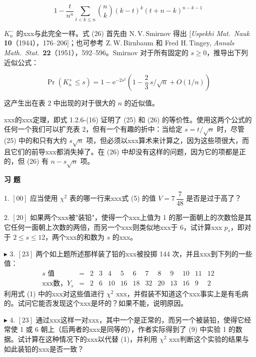 \begin{equation}
1 - \frac{t}{n^n} \sum_{t < k \leqslant n} \binom{n}{k} (k - t)^k (t + n - k)^{n-k-1} \tag{26}
\end{equation}

$K_n^-$ 的xxx与此完全一样。式 (26) 首先由 N.\,V.\,Smirnov 得出 [\textit{Uspekhi Mat.\ Nauk} \textbf{10}（1944），176--206]；也可参考 Z.\,W.\,Birnbaum 和 Fred H.\,Tingey, \textit{Annals Math.\ Stat.}\ \textbf{22}（1951），592--596。Smirnov 对于所有固定的 $s \geqslant 0$，推导出下列近似公式：

\begin{equation}
\Pr(K_n^+ \leqslant s) = 1 - \mathrm{e}^{-2s^2} \left( 1 - \frac{2}{3}\,s/\sqrt{n} + O(1/n) \right) \tag{27}
\end{equation}

\noindent 这产生出在表 2 中出现的对于很大的 $n$ 的近似值。

xxx的xxx定理，即式 1.2.6-(16) 证明了 (25) 和 (26) 的等价性。使用这两个公式的任何一个我们可以扩充表 2，但有一个有趣的折中：当给定 $s = t/\sqrt{n}$ 时，尽管 (25) 中的和只有大约 $s\sqrt{n}$ 项，但必须以xxx算术来计算之，因为这些项很大，而且它们的前导xxx都消失掉了。在 (26) 中却没有这样的问题，因为它的项都是正的，但 (26) 有 $n - s\sqrt{n}$ 项。

\begin{center}
\Large\textbf{习 \quad 题}
\end{center}

1. $[00]$ 应当使用 $\chi^2$ 表的哪一行来xxx式 (5) 的值 $V = 7\,\dfrac{7}{48}$ 是否是过于高了？

2. $[20]$ 如果两个xxx被"装铅"，使得一个xxx上值为 1 的那一面朝上的次数恰是其它任何一面朝上次数的两倍，而另一个xxx则类似地xxx于 6，试计算xxx $p_s$，即对于 $2 \leqslant s \leqslant 12$，两个xxx的和数为 $s$ 的xxx。

$\blacktriangleright$ 3. $[23]$ 两个如上题所述那样装了铅的xxx被投掷 144 次，并且xxx到下列的一些值：
\[
\begin{array}{lcccccccccccc}
s \text{ 值} &=& 2 & 3 & 4 & 5 & 6 & 7 & 8 & 9 & 10 & 11 & 12 \\
\text{xxx数，} Y_s &=& 2 & 6 & 10 & 16 & 18 & 32 & 20 & 13 & 16 & 9 & 2
\end{array}
\]
利用式 (1) 中的xxx对这些值进行 $\chi^2$ xxx，并假装不知道这个xxx事实上是有毛病的。试问它能否发现这个xxx是坏的？如果不能，说明原因。

$\blacktriangleright$ 4. $[23]$ 通过xxx这样一对xxx，其中一个是正常的，而另一个被装铅，使得它经常使 1 或 6 朝上（后两者的xxx是同等的），作者实际得到了 (9) 中实验 1 的数据。试计算在这种情况下的xxx以代替 (1)，并利用 $\chi^2$ xxx判断这个实验的结果与如此装铅的xxx是否一致？

